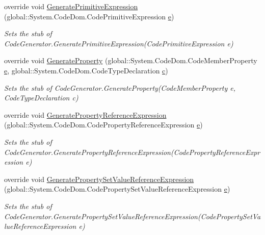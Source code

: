 \begin{DoxyCompactItemize}
override void \hyperlink{class_system_1_1_code_dom_1_1_compiler_1_1_fakes_1_1_stub_code_compiler_a76f1281d678f83afc7a725472b70bf9d}{Generate\-Primitive\-Expression} (global\-::\-System.\-Code\-Dom.\-Code\-Primitive\-Expression \hyperlink{jquery-1_810_82_8min_8js_a2c038346d47955cbe2cb91e338edd7e1}{e})
\begin{DoxyCompactList}\small\item\em Sets the stub of Code\-Generator.\-Generate\-Primitive\-Expression(\-Code\-Primitive\-Expression e)\end{DoxyCompactList}\item 
override void \hyperlink{class_system_1_1_code_dom_1_1_compiler_1_1_fakes_1_1_stub_code_compiler_a5869e6c19e0d0613c9f2ea16d3e5ad41}{Generate\-Property} (global\-::\-System.\-Code\-Dom.\-Code\-Member\-Property \hyperlink{jquery-1_810_82_8min_8js_a2c038346d47955cbe2cb91e338edd7e1}{e}, global\-::\-System.\-Code\-Dom.\-Code\-Type\-Declaration \hyperlink{bootstrap_8min_8js_abce695e0af988ece0826d9ad59b8160d}{c})
\begin{DoxyCompactList}\small\item\em Sets the stub of Code\-Generator.\-Generate\-Property(\-Code\-Member\-Property e, Code\-Type\-Declaration c)\end{DoxyCompactList}\item 
override void \hyperlink{class_system_1_1_code_dom_1_1_compiler_1_1_fakes_1_1_stub_code_compiler_a8304dd4baa7dd3912756c3aff309011c}{Generate\-Property\-Reference\-Expression} (global\-::\-System.\-Code\-Dom.\-Code\-Property\-Reference\-Expression \hyperlink{jquery-1_810_82_8min_8js_a2c038346d47955cbe2cb91e338edd7e1}{e})
\begin{DoxyCompactList}\small\item\em Sets the stub of Code\-Generator.\-Generate\-Property\-Reference\-Expression(\-Code\-Property\-Reference\-Expression e)\end{DoxyCompactList}\item 
override void \hyperlink{class_system_1_1_code_dom_1_1_compiler_1_1_fakes_1_1_stub_code_compiler_a89efd4ec3e29d029adb9e367787459c5}{Generate\-Property\-Set\-Value\-Reference\-Expression} (global\-::\-System.\-Code\-Dom.\-Code\-Property\-Set\-Value\-Reference\-Expression \hyperlink{jquery-1_810_82_8min_8js_a2c038346d47955cbe2cb91e338edd7e1}{e})
\begin{DoxyCompactList}\small\item\em Sets the stub of Code\-Generator.\-Generate\-Property\-Set\-Value\-Reference\-Expression(\-Code\-Property\-Set\-Value\-Reference\-Expression e)\end{DoxyCompactList}\item 

\end{DoxyCompactItemize}
